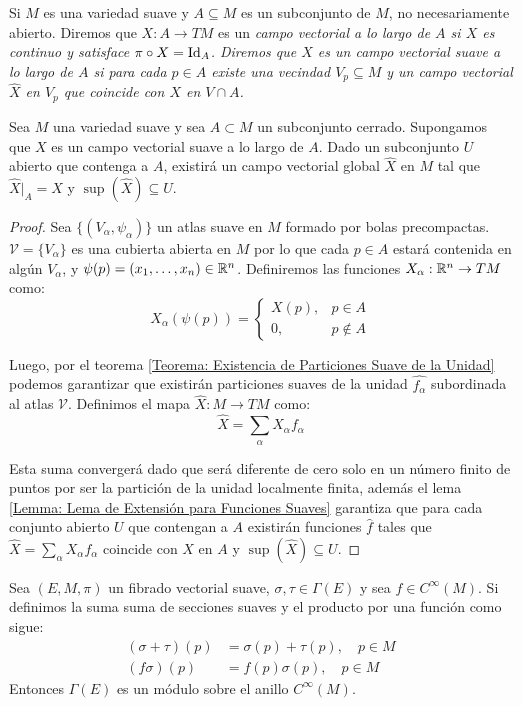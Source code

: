 \begin{definition}
  Si $M$ es una variedad suave y $A \subseteq M$ es un subconjunto de $M$, no necesariamente abierto. Diremos que $X: A \to TM$ es un \it{campo vectorial a lo largo de $A$} si $X$ es continuo y satisface $\pi \circ X = \mathrm{Id}_{A}$. Diremos que $X$ es un \it{campo vectorial suave a lo largo de $A$} si para cada $p \in A$ existe una vecindad $V_p \subseteq M$ y un campo vectorial $\hat{X}$ en $V_p$ que coincide con $X$ en $V \cap A$.
\end{definition}

\begin{lemma}
  Sea $M$ una variedad suave y sea $A \subset M$ un subconjunto cerrado. Supongamos que $X$ es un campo vectorial suave a lo largo de $A$. Dado un subconjunto $U$ abierto que contenga a $A$, existirá un campo vectorial global $\hat{X}$ en $M$ tal que $\hat{X}|_{A} = X$ y $\sup(\hat{X}) \subseteq U$.
\end{lemma}

\begin{proof}
  Sea $\{(V_\alpha,\psi_\alpha)\}$ un atlas suave en $M$ formado por bolas precompactas. $\mathcal{V}=\{V_\alpha\}$ es una cubierta abierta en $M$ por lo que cada $p \in A$ estará contenida en algún $V_\alpha$, y $\psi(p) = (x_1,\dots,x_n) \in \mathbb{R}^n$. Definiremos las funciones $X_\alpha: \mathbb{R}^n \to TM$ como:
  \[
    X_{\alpha}(\psi(p)) = \begin{cases}
      X(p), & p \in A\\
      0, & p \notin A
    \end{cases}
  \]

  Luego, por el teorema \ref{Teorema: Existencia de Particiones Suave de la Unidad} podemos garantizar que existirán particiones suaves de la unidad $\hat{f_\alpha}$ subordinada al atlas $\mathcal{V}$. Definimos el mapa $\hat{X}: M \to TM$ como:
  \[
    \hat{X} = \sum_{\alpha} X_{\alpha}f_\alpha
  \]

  Esta suma convergerá dado que será diferente de cero solo en un número finito de puntos por ser la partición de la unidad localmente finita, además el lema \ref{Lemma: Lema de Extensión para Funciones Suaves} garantiza que para cada conjunto abierto $U$ que contengan a $A$ existirán funciones $\hat{f}$ tales que $\hat{X} = \sum_\alpha  X_\alpha f_\alpha$ coincide con $X$ en $A$ y $\sup(\hat{X}) \subseteq U$. 
\end{proof}

\begin{theorem}
  Sea $(E,M, \pi)$ un fibrado vectorial suave, $\sigma, \tau \in \Gamma(E)$ y sea $f \in C^{\infty}(M)$. Si definimos la suma suma de secciones suaves y el producto por una función como sigue:
\begin{align*}
  (\sigma + \tau)(p) &= \sigma(p) + \tau(p), \quad p \in M\\
  (f\sigma)(p) &= f(p)\sigma(p), \quad p \in M
\end{align*}
  Entonces $\Gamma(E)$ es un módulo sobre el anillo $C^{\infty}(M)$.
\end{theorem}

